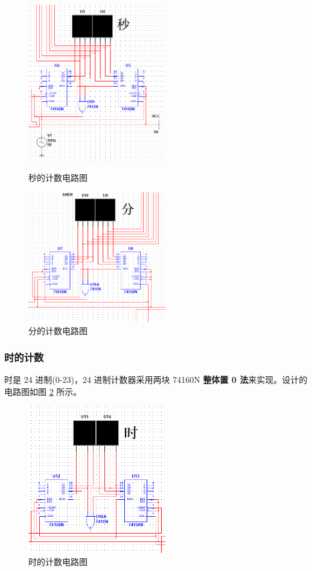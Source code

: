\begin{figure}[htbp]
	\centering
	\begin{minipage}[t]{0.48\textwidth}
		\centering
		\includegraphics[width=6cm]{figure/second.png}
		\caption{秒的计数电路图}\label{fig:second}
	\end{minipage}
	\begin{minipage}[t]{0.48\textwidth}
		\centering
		\includegraphics[width=6cm]{figure/minute.png}
		\caption{分的计数电路图}\label{fig:minute}
	\end{minipage}
\end{figure}

\subsubsection{时的计数}

时是 24 进制(0-23)，24 进制计数器采用两块 74160N \textbf{整体置 0 法}来实现。设计的电路图如图 \ref{fig:hour} 所示。

\begin{figure}[hbtp]
	\centering
	\includegraphics[width=6cm]{figure/hour.png}
	\caption{时的计数电路图}\label{fig:hour}
\end{figure}

